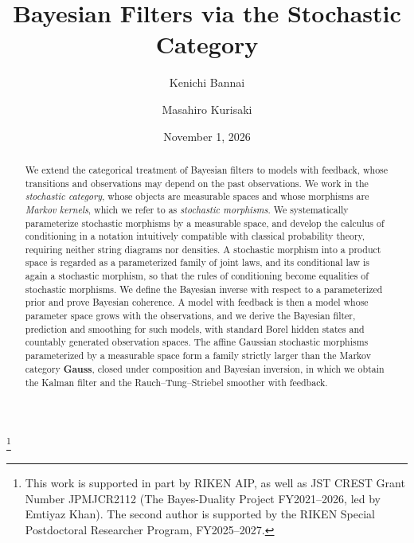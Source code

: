 \documentclass[12pt,reqno]{amsart}%
\theoremstyle{plain}
\theoremstyle{definition}
\begin{document}
\setcounter{tocdepth}{1}
\newpage
\title{Bayesian Filters via the Stochastic Category}
\author[K. Bannai]{Kenichi Bannai}
\author[M. Kurisaki]{Masahiro Kurisaki}
\thanks{This work is supported in part by RIKEN AIP, as well as JST CREST Grant Number JPMJCR2112 (The Bayes-Duality Project FY2021--2026, led by Emtiyaz Khan).
The second author is supported by the RIKEN Special Postdoctoral Researcher Program, FY2025--2027.}
\address[Bannai]{Department of Mathematics, Faculty of Science and Technology, Keio University, 3-14-1 Hiyoshi, Kouhoku-ku, Yokohama 223-8522, Japan.}
\address[Bannai, Kurisaki]{Mathematical Science Team, RIKEN Center for Advanced Intelligence Project (AIP), 1-4-1 Nihonbashi, Chuo-ku, Tokyo 103-0027, Japan.}

\date{November 1, 2026}
\begin{abstract}
	We extend the categorical treatment of Bayesian filters to models with feedback,
	whose transitions and observations may depend on the past observations.
	We work in the \emph{stochastic category}, whose objects are measurable spaces and whose
	morphisms are \emph{Markov kernels},
	which we refer to as \emph{stochastic morphisms}.
	We systematically parameterize stochastic morphisms by a measurable space,
	and develop the calculus of conditioning in a notation intuitively 
	compatible with classical probability theory,
	requiring neither string diagrams nor densities.
	A stochastic morphism into a product space is regarded as a parameterized family of joint laws,
	and its conditional law is again a stochastic morphism,
	so that the rules of conditioning become equalities of stochastic morphisms.
	We define the Bayesian inverse with respect to a parameterized prior and prove Bayesian coherence.
	A model with feedback is then a model whose parameter space grows with the observations,
	and we derive the Bayesian filter, prediction and smoothing for such models,
	with standard Borel hidden states and countably generated observation spaces.
	The affine Gaussian stochastic morphisms parameterized by a measurable space
	form a family strictly larger than the Markov category \textbf{Gauss},
	closed under composition and Bayesian inversion,
	in which we obtain the Kalman filter and the Rauch--Tung--Striebel smoother with feedback.
\end{abstract}

\maketitle
\end{document}
